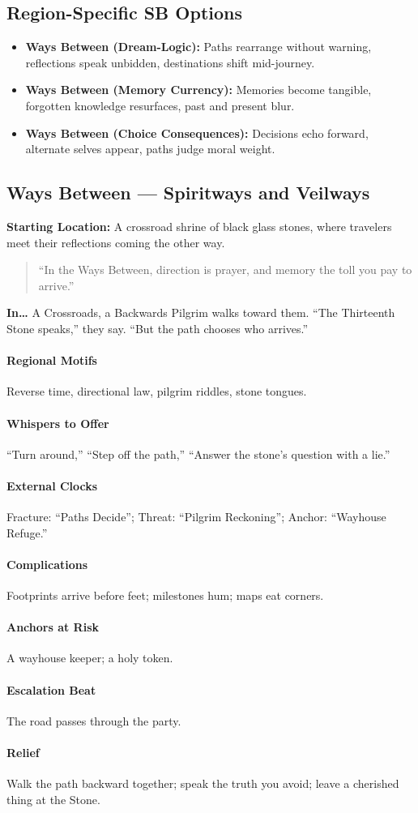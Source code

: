 \subsection*{Region-Specific SB Options}
\begin{itemize}
\item \textbf{Ways Between (Dream-Logic):} Paths rearrange without warning, reflections speak unbidden, destinations shift mid-journey.
\item \textbf{Ways Between (Memory Currency):} Memories become tangible, forgotten knowledge resurfaces, past and present blur.
\item \textbf{Ways Between (Choice Consequences):} Decisions echo forward, alternate selves appear, paths judge moral weight.
\end{itemize}


\subsection*{Ways Between — Spiritways and Veilways}
\textbf{Starting Location:} A crossroad shrine of black glass stones, where travelers meet their reflections coming the other way.
\begin{quote}
“In the Ways Between, direction is prayer, and memory the toll you pay to arrive.”
\end{quote}

\textbf{In…} A Crossroads, a Backwards Pilgrim walks toward them. ``The Thirteenth Stone speaks,'' they say. ``But the path chooses who arrives.''
\paragraph{Regional Motifs} Reverse time, directional law, pilgrim riddles, stone tongues.
\paragraph{Whispers to Offer} ``Turn around,'' ``Step off the path,'' ``Answer the stone’s question with a lie.''
\paragraph{External Clocks} Fracture: ``Paths Decide''; Threat: ``Pilgrim Reckoning''; Anchor: ``Wayhouse Refuge.''
\paragraph{Complications} Footprints arrive before feet; milestones hum; maps eat corners.
\paragraph{Anchors at Risk} A wayhouse keeper; a holy token.
\paragraph{Escalation Beat} The road passes through the party.
\paragraph{Relief} Walk the path backward together; speak the truth you avoid; leave a cherished thing at the Stone.